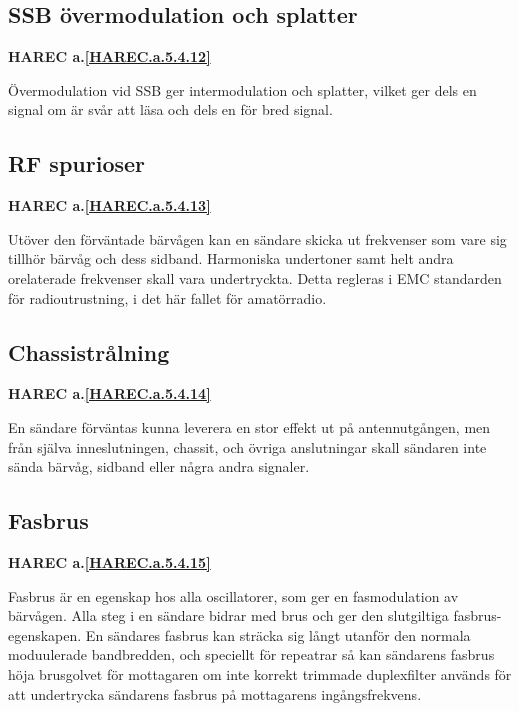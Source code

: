 \subsection{SSB övermodulation och splatter}
\textbf{HAREC
  a.\ref{HAREC.a.5.4.12}\label{myHAREC.a.5.4.12}
}

Övermodulation vid SSB ger intermodulation och splatter, vilket ger dels en
signal om är svår att läsa och dels en för bred signal.

\subsection{RF spurioser}
\textbf{HAREC
  a.\ref{HAREC.a.5.4.13}\label{myHAREC.a.5.4.13}
}

Utöver den förväntade bärvågen kan en sändare skicka ut frekvenser som vare
sig tillhör bärvåg och dess sidband. Harmoniska undertoner samt helt andra
orelaterade frekvenser skall vara undertryckta. Detta regleras i EMC
standarden för radioutrustning, i det här fallet för amatörradio.

\subsection{Chassistrålning}
\textbf{HAREC
  a.\ref{HAREC.a.5.4.14}\label{myHAREC.a.5.4.14}
}

En sändare förväntas kunna leverera en stor effekt ut på antennutgången, men
från själva inneslutningen, chassit, och övriga anslutningar skall sändaren
inte sända bärvåg, sidband eller några andra signaler.

\subsection{Fasbrus}
\textbf{HAREC
  a.\ref{HAREC.a.5.4.15}\label{myHAREC.a.5.4.15}
}

Fasbrus är en egenskap hos alla oscillatorer, som ger en fasmodulation av
bärvågen. Alla steg i en sändare bidrar med brus och ger den slutgiltiga
fasbrus-egenskapen. En sändares fasbrus kan sträcka sig långt utanför den
normala moduulerade bandbredden, och speciellt för repeatrar så kan sändarens
fasbrus höja brusgolvet för mottagaren om inte korrekt trimmade duplexfilter
används för att undertrycka sändarens fasbrus på mottagarens ingångsfrekvens.
